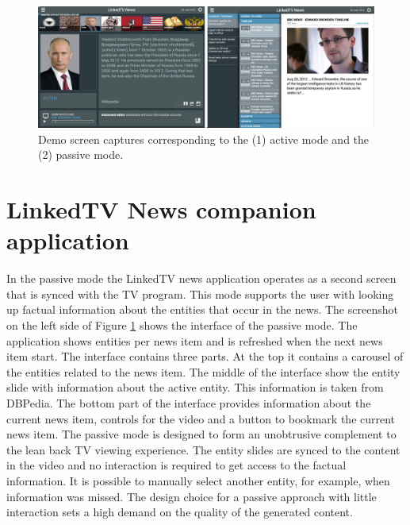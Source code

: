 \documentclass{llncs}
\begin{document}

\begin{figure}[h!]
\centering
\includegraphics[width=1\textwidth]{figure/DemoScreen}
\caption{Demo screen captures corresponding to the (1) active mode and the (2) passive mode.}
\label{fig:interface}%
\end{figure}

\section{LinkedTV News companion application}
\label{sec:tvnews}

In the passive mode the LinkedTV news application operates as a second screen that is synced with the TV program. This mode supports the user with looking up factual information about the entities that occur in the news. The screenshot on the left side of Figure \ref{fig:interface} shows the interface of the passive mode. The application shows entities per news item and is refreshed when the next news item start. The interface contains three parts. At the top it contains a carousel of the entities related to the news item. The middle of the interface show the entity slide with information about the active entity. This information is taken from DBPedia. The bottom part of the interface provides information about the current news item, controls for the video and a button to bookmark the current news item. The passive mode is designed to form an unobtrusive complement to the lean back TV viewing experience. The entity slides are synced to the content in the video and no interaction is required to get access to the factual information. It is possible to manually select another entity, for example, when information was missed. The design choice for a passive approach with little interaction sets a high demand on the quality of the generated content. 
\end{document}
